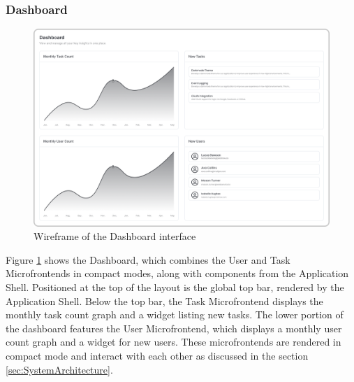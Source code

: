 \subsubsection*{Dashboard}
\begin{figure}[h]
    \centerline{\includegraphics[width=1\textwidth]{images/wireframes/dashboard.png}}
    \caption[Dashboard wireframe]{Wireframe of the Dashboard interface}
    \label{fig:dashboard-wireframe}
\end{figure}
Figure \ref{fig:dashboard-wireframe} shows the Dashboard, which combines the User and Task Microfrontends in compact modes, along with components from the Application Shell. Positioned at the top of the layout is the global top bar, rendered by the Application Shell. Below the top bar, the Task Microfrontend displays the monthly task count graph and a widget listing new tasks. The lower portion of the dashboard features the User Microfrontend, which displays a monthly user count graph and a widget for new users. These microfrontends are rendered in compact mode and interact with each other as discussed in the section \ref{sec:SystemArchitecture}.
